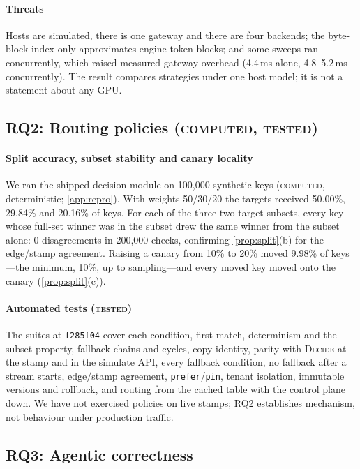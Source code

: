 \documentclass[conference,letterpaper]{IEEEtran}
\newcommand{\code}[1]{\texttt{\small #1}}
\newcommand{\ev}[1]{{\normalfont\textsc{#1}}}
\newcommand{\Tested}{\ev{tested}}
\newcommand{\Computed}{\ev{computed}}
\newcommand{\commit}{\code{f285f04}}
\begin{document}
\paragraph*{Threats}
Hosts are simulated, there is one gateway and there are four backends; the byte-block index
only approximates engine token blocks; and some sweeps ran concurrently, which raised measured
gateway overhead (4.4\,ms alone, 4.8--5.2\,ms concurrently). The result compares strategies
under one host model; it is not a statement about any GPU.

\subsection{RQ2: Routing policies \normalfont(\Computed{}, \Tested{})}
\label{sec:eval-policies}

\paragraph*{Split accuracy, subset stability and canary locality}
We ran the shipped decision module on 100{,}000 synthetic keys (\Computed{}, deterministic;
\cref{app:repro}). With weights 50/30/20 the targets received 50.00\%, 29.84\% and 20.16\% of
keys. For each of the three two-target subsets, every key whose full-set winner was in the
subset drew the same winner from the subset alone: 0 disagreements in 200{,}000 checks,
confirming \cref{prop:split}(b) for the edge/stamp agreement. Raising a canary from 10\% to
20\% moved 9.98\% of keys---the minimum, 10\%, up to sampling---and every moved key moved onto
the canary (\cref{prop:split}(c)).

\paragraph*{Automated tests (\Tested{})}
The suites at \commit{} cover each condition, first match, determinism and the subset property,
fallback chains and cycles, copy identity, parity with \textsc{Decide} at the stamp and in the
simulate API, every fallback condition, no fallback after a stream starts, edge/stamp agreement,
\code{prefer}/\code{pin}, tenant isolation, immutable versions and rollback, and routing from
the cached table with the control plane down. We have not exercised policies on live stamps;
RQ2 establishes mechanism, not behaviour under production traffic.

\subsection{RQ3: Agentic correctness}
\label{sec:eval-agents}
\end{document}
